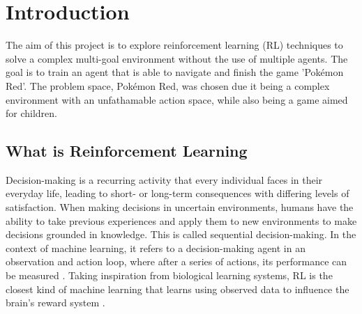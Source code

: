 \section{Introduction}

The aim of this project is to explore reinforcement learning (RL) techniques to solve a complex multi-goal environment without the use of multiple agents. The goal is to train an agent that is able to navigate and finish the game 'Pokémon Red'. The problem space, Pokémon Red, was chosen due it being a complex environment with an unfathamable action space, while also being a game aimed for children.


\subsection{What is Reinforcement Learning}

Decision-making is a recurring activity that every individual faces in their everyday life, leading to short- or long-term consequences with differing levels of satisfaction. When making decisions in uncertain environments, humans have the ability to take previous experiences and apply them to new environments to make decisions grounded in knowledge. This is called sequential decision-making. In the context of machine learning, it refers to a decision-making agent in an observation and action loop, where after a series of actions, its performance can be measured \cite{francon2020effective}. Taking inspiration from biological learning systems, RL is the closest kind of machine learning that learns using observed data to influence the brain's reward system \cite{Sutton1}. 

